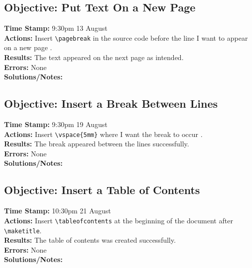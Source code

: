 \documentclass{article}
\begin{document}
\begin{FlushLeft}
\subsection{Objective: Put Text On a New Page}
\textbf{Time Stamp:} 9:30pm 13 August\\
\textbf{Actions:} Insert \verb|\pagebreak| in the source code before the line I want to appear on a new page .\\
\textbf{Results:} The text appeared on the next page as intended.\\
\textbf{Errors:} None\\
\textbf{Solutions/Notes:}

\subsection{Objective: Insert a Break Between Lines}
\textbf{Time Stamp:} 9:30pm 19 August\\
\textbf{Actions:} Insert \verb|\vspace{5mm}| where I want the break to occur .\\
\textbf{Results:} The break appeared between the lines successfully.\\
\textbf{Errors:} None\\
\textbf{Solutions/Notes:}

\subsection{Objective: Insert a Table of Contents}
\textbf{Time Stamp:} 10:30pm 21 August\\
\textbf{Actions:} Insert \verb|\tableofcontents| at the beginning of the document after \verb|\maketitle|.\\
\textbf{Results:} The table of contents was created successfully.\\
\textbf{Errors:} None\\
\textbf{Solutions/Notes:}


\end{FlushLeft}
\end{document}
